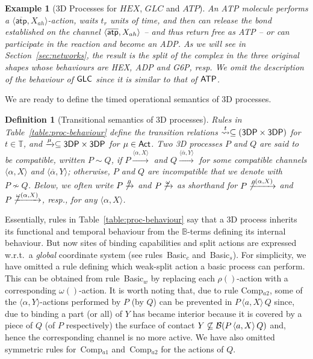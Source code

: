 \documentclass[11pt]{article}
\newtheorem{example}{Example}
\newcommand{\comp}{\sim}
\newcommand{\Act}{{\sf Act}}
\newcommand{\proc}{\sf{3DP}}
\newcommand{\bpa}{\mathbb{B}}
\newcommand{\unionc}[1]{\,\langle #1 \rangle\,}
\newcommand{\nar}[1]{\xrightarrow{#1}}
\newcommand{\wnar}[1]{\stackrel{#1}{\rightsquigarrow}}
\def\name#1{\mbox{\sc #1}}
\newcommand{\boundary}[1]{\ensuremath{{\cal B}(#1)}}
\newcommand{\timedomain}{{\mathbb T}}
\newtheorem{definition}{Definition}
\begin{document}
\begin{example}[3D Processes for $HEX$, $GLC$ and $ATP$]
An ATP molecule performs a $\langle \overline{\mathsf{atp}}, X_{ah} \rangle$-action, waits $t_{r}$
units of time, and then can release the bond established on the channel $\langle \overline{{\sf
atp}}, X_{ah} \rangle$ -- and thus return free as ATP  -- or can participate in the reaction and become an ADP. As we will see in Section~\ref{sec:networks}, the result is the split of the complex in the three original shapes whose behaviours are {\sf HEX}, {\sf ADP} and {\sf G6P}, resp. We omit the description of the behaviour of ${\sf GLC}$ since it is similar to that of ${\sf ATP}$.
\end{example}

We are ready to define the timed operational semantics of 3D processes.

\begin{definition}[Transitional semantics of 3D processes]
\label{def:tbehprocesses}
Rules in Table~\ref{table:proc-behaviour} define the transition relations $\wnar{t} \subseteq (\proc
\times \proc)$ for $t \in \timedomain$, and $\nar{\mu} \subseteq \proc \times \proc$ for  $\mu
\in \Act$.
Two 3D processes $P$ and $Q$ are said to be {\em compatible}, written $P \comp Q$, if $P\nar{\langle
\alpha, X\rangle}$  and $Q\nar{\langle \overline{\alpha}, Y\rangle}$ for some compatible channels
$\langle \alpha, X\rangle$ and $\langle \overline{\alpha}, Y\rangle$;
otherwise, $P$ and $Q$ are {\em incompatible} that we denote with $P \not\comp Q$.
Below, we often write $P \not \nar{\rho}$ and $P \not\nar{\omega}$ as shorthand for
$P\not\nar{\rho(\alpha, X)}$ and $P\not\nar{\omega(\alpha, X)}$, resp., for any $\langle \alpha, X
\rangle$.
\end{definition}

Essentially, rules in Table~\ref{table:proc-behaviour} say that a 3D process inherits its functional and temporal behaviour from the $\bpa$-terms defining its internal behaviour. But now sites of binding capabilities and split actions are expressed w.r.t.\ a {\em global} coordinate system (see rules~\name{Basic$_c$} and~\name{Basic$_s$}). For simplicity, we have omitted a rule defining which weak-split action a basic process can perform. This can be obtained from rule~\name{Basic$_w$} by replacing each $\rho()$-action with a corresponding $\omega()$-action. It is worth noting that, due to rule \name{Comp$_{a2}$}, some of the $\langle \alpha, Y \rangle$-actions performed by $P$ (by $Q$) can be prevented in $P \unionc{a, X} Q$ since, due to binding a part (or all) of $Y$ has became interior because it is covered by a piece of $Q$ (of $P$ respectively) the surface of contact $Y \not \subseteq \boundary{P \unionc{a, X} Q}$ and, hence the corresponding channel is no more active. We have also omitted symmetric rules for~\name{Comp$_{a1}$} and~\name{Comp$_{a2}$} for the actions of $Q$.
\end{document}

